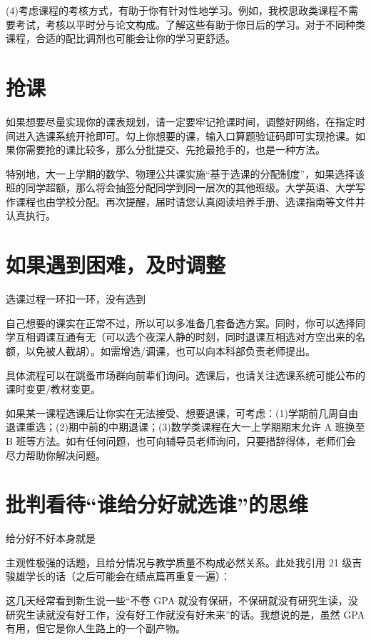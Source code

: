 (4)考虑课程的考核方式，有助于你有针对性地学习。例如，我校思政类课程不需要考试，考核以平时分与论文构成。了解这些有助于你日后的学习。对于不同种类课程，合适的配比调剂也可能会让你的学习更舒适。

\section{抢课}

如果想要尽量实现你的课表规划，请一定要牢记抢课时间，调整好网络，在指定时间进入选课系统开抢即可。勾上你想要的课，输入口算题验证码即可实现抢课。如果你需要抢的课比较多，那么分批提交、先抢最抢手的，也是一种方法。

特别地，大一上学期的数学、物理公共课实施“基于选课的分配制度”，如果选择该班的同学超额，那么将会抽签分配同学到同一层次的其他班级。大学英语、大学写作课程也由学校分配。再次提醒，届时请您认真阅读培养手册、选课指南等文件并认真执行。

\section{如果遇到困难，及时调整}

选课过程一环扣一环，没有选到

自己想要的课实在正常不过，所以可以多准备几套备选方案。同时，你可以选择同学互相调课互通有无（可以选个夜深人静的时刻，同时退课互相选对方空出来的名额，以免被人截胡）。如需增选/调课，也可以向本科部负责老师提出。

具体流程可以在跳蚤市场群向前辈们询问。选课后，也请关注选课系统可能公布的课时变更/教材变更。

如果某一课程选课后让你实在无法接受、想要退课，可考虑：(1)学期前几周自由退课重选；(2)期中前的中期退课；(3)数学类课程在大一上学期期末允许 A 班换至 B 班等方法。如有任何问题，也可向辅导员老师询问，只要措辞得体，老师们会尽力帮助你解决问题。

\section{批判看待“谁给分好就选谁”的思维}

给分好不好本身就是

主观性极强的话题，且给分情况与教学质量不构成必然关系。此处我引用 21 级吉骏雄学长的话（之后可能会在绩点篇再重复一遍）：

这几天经常看到新生说一些“不卷 GPA 就没有保研，不保研就没有研究生读，没研究生读就没有好工作，没有好工作就没有好未来”的话。我想说的是，虽然 GPA 有用，但它是你人生路上的一个副产物。

